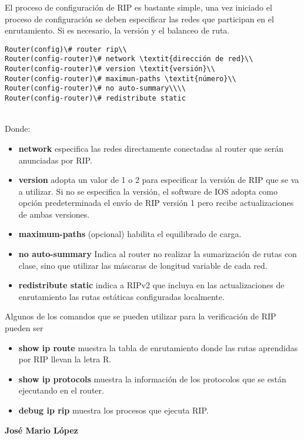 \documentclass[12pt]{article}
\begin{document}
El proceso de configuración de RIP es bastante simple, una vez iniciado el proceso de configuración se deben especificar las redes que participan en el enrutamiento. Si es necesario, la versión y el balanceo de ruta.\\\vspace{5px}

\begin{lstlisting}
Router(config)\# router rip\\
Router(config-router)\# network \textit{dirección de red}\\
Router(config-router)\# version \textit{versión}\\
Router(config-router)\# maximun-paths \textit{número}\\
Router(config-router)\# no auto-summary\\\\
Router(config-router)\# redistribute static
\end{lstlisting}
\vspace{5px}
\\
Donde:
\begin{itemize}
\item \textbf{network} especifica las redes directamente conectadas al router que serán anunciadas por RIP.
\item \textbf{version} adopta un valor de 1 o 2 para especificar la versión de RIP que se va a utilizar. Si no se especifica la versión, el software de IOS adopta como opción predeterminada el envío de RIP versión 1 pero recibe actualizaciones de ambas versiones.
\item \textbf{maximum-paths} (opcional) habilita el equilibrado de carga.
\item \textbf{no auto-summary} Indica al router no realizar la sumarización de rutas con clase, sino que utilizar las máscaras de longitud variable de cada red.
\item \textbf{redistribute static} indica a RIPv2 que incluya en las actualizaciones de enrutamiento las rutas estáticas configuradas localmente.
\end{itemize}

Algunos de los comandos que se pueden utilizar para la verificación de RIP pueden ser
\begin{itemize}
\item \textbf{show ip route} muestra la tabla de enrutamiento donde las rutas aprendidas por RIP llevan la letra R.
\item \textbf{show ip protocols} muestra la información de los protocolos que se están ejecutando en el router.
\item \textbf{debug ip rip} muestra los procesos que ejecuta RIP.
\end{itemize}
\vfill
{\textbf {\normalsize José Mario López}}
\end{document}
